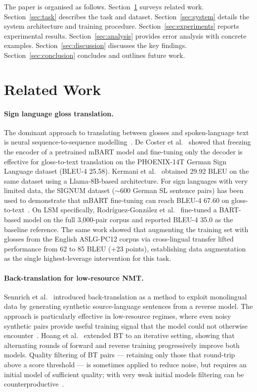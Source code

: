 \documentclass[sigconf,screen]{ceurart}
\begin{document}
The paper is organised as follows.
Section~\ref{sec:related} surveys related work.
Section~\ref{sec:task} describes the task and dataset.
Section~\ref{sec:system} details the system architecture and training
procedure.
Section~\ref{sec:experiments} reports experimental results.
Section~\ref{sec:analysis} provides error analysis with concrete examples.
Section~\ref{sec:discussion} discusses the key findings.
Section~\ref{sec:conclusion} concludes and outlines future work.

\section{Related Work}
\label{sec:related}

\paragraph{Sign language gloss translation.}
The dominant approach to translating between glosses and spoken-language
text is neural sequence-to-sequence modelling~\cite{camgoz2020sign2text}.
De Coster et al.~\cite{decoster2021frozen} showed that freezing the
encoder of a pretrained mBART model and fine-tuning only the decoder
is effective for gloss-to-text translation on the PHOENIX-14T
German Sign Language dataset (BLEU-4 25.58).
Kermani et al.~\cite{wslp2025} obtained 29.92 BLEU on the same
dataset using a Llama-8B-based architecture.
For sign languages with very limited data, the SIGNUM dataset
($\sim$600 German SL sentence pairs) has been used to demonstrate
that mBART fine-tuning can reach BLEU-4 67.60
on gloss-to-text~\cite{wslp2025}.
On LSM specifically, Rodr\'iguez-Gonz\'alez et al.~\cite{rodriguez2026overview} fine-tuned
a BART-based model on the full 3,000-pair corpus and reported BLEU-4 35.0
as the baseline reference.
The same work showed that augmenting the training set with glosses from
the English ASLG-PC12 corpus via cross-lingual transfer lifted
performance from 62 to 85 BLEU (+23 points), establishing data
augmentation as the single highest-leverage intervention for this task.

\paragraph{Back-translation for low-resource NMT.}
Sennrich et al.~\cite{sennrich2016bt} introduced back-translation as a
method to exploit monolingual data by generating synthetic source-language
sentences from a reverse model.
The approach is particularly effective in low-resource regimes, where
even noisy synthetic pairs provide useful training signal that the model
could not otherwise encounter~\cite{edunov2018bt}.
Hoang et al.~\cite{hoang2018iterative} extended BT to an iterative
setting, showing that alternating rounds of forward and reverse training
progressively improve both models.
Quality filtering of BT pairs --- retaining only those that
round-trip above a score threshold --- is sometimes applied to
reduce noise, but requires an initial model of sufficient quality;
with very weak initial models filtering can be
counterproductive~\cite{caswell2019tagged}.
\end{document}
